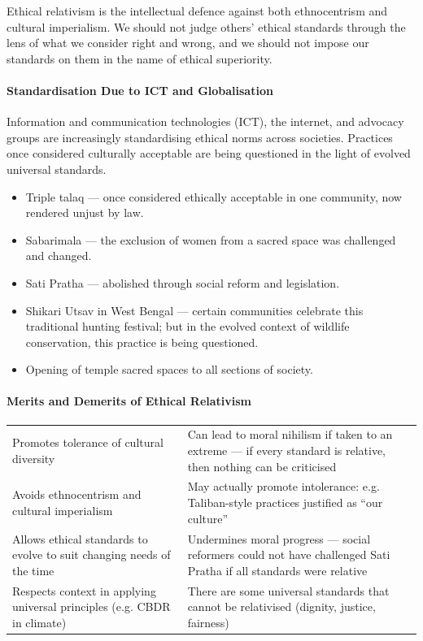 Ethical relativism is the intellectual defence against both ethnocentrism and cultural imperialism. We should not judge others' ethical standards through the lens of what we consider right and wrong, and we should not impose our standards on them in the name of ethical superiority.

\paragraph{Standardisation Due to ICT and Globalisation} Information and communication technologies (ICT), the internet, and advocacy groups are increasingly standardising ethical norms across societies. Practices once considered culturally acceptable are being questioned in the light of evolved universal standards.

\begin{ExampleBox}
\begin{itemize}
\item Triple talaq --- once considered ethically acceptable in one community, now rendered unjust by law.
\item Sabarimala --- the exclusion of women from a sacred space was challenged and changed.
\item Sati Pratha --- abolished through social reform and legislation.
\item Shikari Utsav in West Bengal --- certain communities celebrate this traditional hunting festival; but in the evolved context of wildlife conservation, this practice is being questioned.
\item Opening of temple sacred spaces to all sections of society.
\end{itemize}
\end{ExampleBox}

\paragraph{Merits and Demerits of Ethical Relativism}

\begin{center}
\begin{tabularx}{\textwidth}{Y Y}
 &  \\
\toprule
Promotes tolerance of cultural diversity & Can lead to moral nihilism if taken to an extreme --- if every standard is relative, then nothing can be criticised \\
Avoids ethnocentrism and cultural imperialism & May actually promote intolerance: e.g. Taliban-style practices justified as ``our culture'' \\
Allows ethical standards to evolve to suit changing needs of the time & Undermines moral progress --- social reformers could not have challenged Sati Pratha if all standards were relative \\
Respects context in applying universal principles (e.g. CBDR in climate) & There are some universal standards that cannot be relativised (dignity, justice, fairness) \\
\bottomrule
\end{tabularx}
\end{center}

